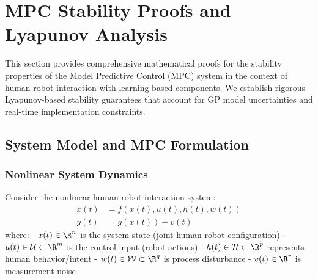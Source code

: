 \section{MPC Stability Proofs and Lyapunov Analysis}

This section provides comprehensive mathematical proofs for the stability properties of the Model Predictive Control (MPC) system in the context of human-robot interaction with learning-based components. We establish rigorous Lyapunov-based stability guarantees that account for GP model uncertainties and real-time implementation constraints.

\subsection{System Model and MPC Formulation}

\subsubsection{Nonlinear System Dynamics}

Consider the nonlinear human-robot interaction system:
\begin{align}
\label{eq:system_dynamics}
\dot{x}(t) &= f(x(t), u(t), h(t), w(t)) \\
y(t) &= g(x(t)) + v(t)
\end{align}
where:
- $x(t) \in \R^n$ is the system state (joint human-robot configuration)
- $u(t) \in \mathcal{U} \subset \R^m$ is the control input (robot actions)
- $h(t) \in \mathcal{H} \subset \R^p$ represents human behavior/intent
- $w(t) \in \mathcal{W} \subset \R^q$ is process disturbance
- $v(t) \in \R^r$ is measurement noise

